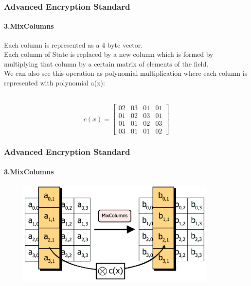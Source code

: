 \begin{frame}
	\frametitle{Advanced Encryption Standard}
		\framesubtitle{3.MixColumns}
		\vfill
	\vspace{-1cm}
	\begin{block}{}
		\footnotesize {
    	{Each column is represented as a 4 byte vector.}\\
		{Each column of State is replaced by a new column which is formed by multiplying that column by a certain 			matrix of elements of the field.}\\
    	{We can also see this operation as polynomial multiplication where each column is represented with 				 	polynomial a(x):}\\
		\\
		}
	\end{block}
	\begin{block}{}
	{ $$c(x)= \left[
        \begin{array}{cccc}
         02 & 03 & 01 & 01\\
         01 & 02 & 03 & 01\\
         01 & 01 & 02 & 03\\
         03 & 01 & 01 & 02
         \end{array}
      \right] $$}
	\end{block}
	
\end{frame}

\begin{frame}
	\frametitle{Advanced Encryption Standard}
		\framesubtitle{3.MixColumns }
		\vfill
		\begin{figure}
		\centering
		\includegraphics[width=10cm]{mixcolumn}
		\label{fig:obrazek mixcolumn}
	\end{figure}
\end{frame}

